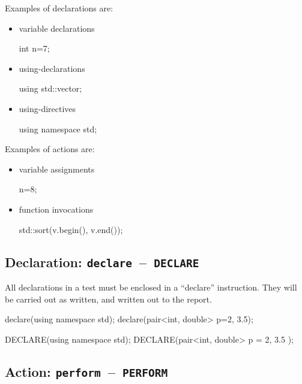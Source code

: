\documentclass[twoside, a4paper, article]{memoir}
\newcommand*\testudocolor{\color{red!80!blue}}
\newcommand*\testudo[1]{\texttt{\testudocolor{}#1}}
\newcommand*\testudopair[2]{\testudo{#1}~--~\testudo{#2}}
\begin{document}
Examples of declarations are:
\begin{itemize}
\item variable declarations
\begin{cpplisting}
int n=7;
\end{cpplisting}

\item using-declarations
\begin{cpplisting}
using std::vector;
\end{cpplisting}

\item using-directives
\begin{cpplisting}
using namespace std;
\end{cpplisting}
\end{itemize}

Examples of actions are:
\begin{itemize}
\item variable assignments
\begin{cpplisting}
n=8;
\end{cpplisting}

\item function invocations
\begin{cpplisting}
std::sort(v.begin(), v.end());
\end{cpplisting}
\end{itemize}

\subsection{Declaration: \testudopair{declare}{DECLARE}}
\label{sec:declaration}

All declarations in a test must be enclosed in a ``declare'' instruction.  They
will be carried out as written, and written out to the report.
\begin{cpplisting}
declare(using namespace std);
declare(pair<int, double> p={2, 3.5});
\end{cpplisting}

\begin{cpplisting}
DECLARE(using namespace std);
DECLARE(pair<int, double> p = { 2, 3.5 });
\end{cpplisting}

\subsection{Action: \testudopair{perform}{PERFORM}}
\label{sec:action}
\end{document}
